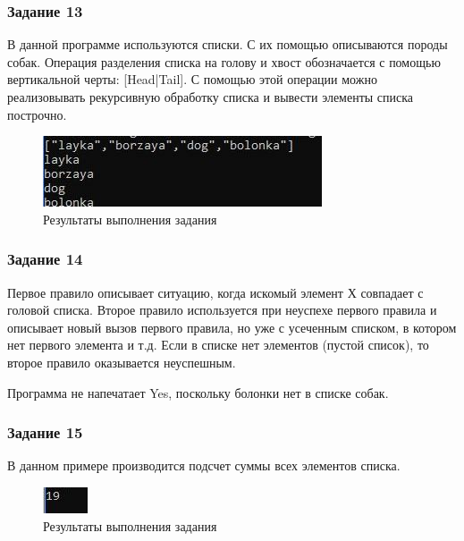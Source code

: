 \documentclass[14pt,a4paper,report]{report}
\begin{document}
\subsubsection{Задание 13}

В данной программе используются списки. С их помощью описываются породы собак. Операция разделения списка на голову и хвост обозначается с помощью вертикальной черты: [Head|Tail]. С помощью этой операции можно реализовывать рекурсивную обработку списка и вывести элементы списка построчно.



\begin{figure}[h!]
	\centering
	\includegraphics[scale = 1.0]{images/d13.jpeg}
	\caption{Результаты выполнения задания}
\end{figure}

\subsubsection{Задание 14}

Первое правило описывает ситуацию, когда искомый элемент Х совпадает с головой списка. Второе правило используется при неуспехе первого правила и описывает новый вызов первого правила, но уже с усеченным списком, в котором нет первого элемента и т.д. Если в списке нет элементов (пустой список), то второе правило оказывается неуспешным.

Программа не напечатает Yes, поскольку болонки нет в списке собак.




\subsubsection{Задание 15}

В данном примере производится подсчет суммы всех элементов списка. 



\begin{figure}[h!]
	\centering
	\includegraphics[scale = 1.0]{images/d15.jpeg}
	\caption{Результаты выполнения задания}
\end{figure}
\end{document}
